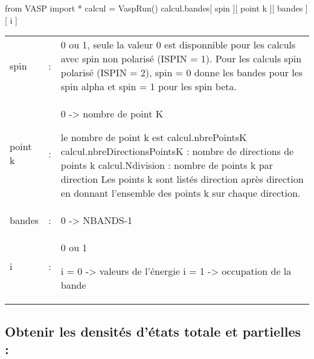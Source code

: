 \documentclass[10pt,a4paper,fleqn]{article}
\begin{document}
\begin{itemize}
\begin{console}
from VASP import *
calcul = VaspRun()
calcul.bandes[ spin ][ point k ][ bandes ][ i ]
\end{console}

\begin{tabularx}{0.95\textwidth}{lcX}
    
                    spin  &  : & 0 ou 1, seule la valeur 0 est disponnible pour les calculs
                            avec spin non polarisé (ISPIN = 1). Pour les calculs spin
                            polarisé (ISPIN = 2), spin = 0 donne les bandes pour les
                            spin alpha et spin = 1 pour les spin beta. \\
    
                    point k & : & 0 -> nombre de point K\par
                            le nombre de point k est calcul.nbrePointsK
                            calcul.nbreDirectionsPointsK : nombre de directions de points k
                            calcul.Ndivision             : nombre de points k par direction
                            Les points k sont listés direction après direction en
                            donnant l'ensemble des points k sur chaque direction. \\
    
                    bandes & : & 0 -> NBANDS-1 \\
    
                    i   &    : & 0 ou 1 \par
                            i = 0 -> valeurs de l'énergie
                            i = 1 -> occupation de la bande \\
\end{tabularx}

\end{itemize}

\subsection{Obtenir les densités d'états totale et partielles :}
\end{document}
